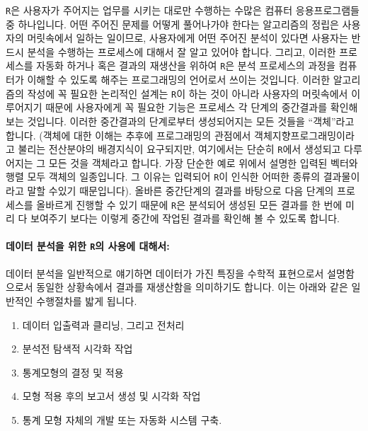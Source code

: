 \documentclass[tutorial.tex]{subfiles}
\begin{document}
\texttt{R}은 사용자가 주어지는 업무를 시키는 대로만 수행하는 수많은 컴퓨터 응용프로그램들 중 하나입니다.
어떤 주어진 문제를 어떻게 풀어나가야 한다는 알고리즘의 정립은 사용자의 머릿속에서 일하는 일이므로, 사용자에게 어떤 주어진 분석이 있다면 사용자는 반드시 분석을 수행하는 프로세스에 대해서 잘 알고 있어야 합니다.
그리고, 이러한 프로세스를 자동화 하거나 혹은 결과의 재생산을 위하여 \texttt{R}은 분석 프로세스의 과정을 컴퓨터가 이해할 수 있도록 해주는 프로그래밍의 언어로서 쓰이는 것입니다.
이러한 알고리즘의 작성에 꼭 필요한 논리적인 설계는 \texttt{R}이 하는 것이 아니라 사용자의 머릿속에서 이루어지기 때문에 사용자에게 꼭 필요한 기능은 프로세스 각 단계의 중간결과를 확인해 보는 것입니다. 
이러한 중간결과의 단계로부터 생성되어지는 모든 것들을 ``객체''라고 합니다.
(객체에 대한 이해는 추후에 프로그래밍의 관점에서 객체지향프로그래밍이라고 불리는 전산분야의 배경지식이 요구되지만, 여기에서는 단순히 \texttt{R}에서 생성되고 다루어지는 그 모든 것을 객체라고 합니다.  
가장 단순한 예로 위에서 설명한 입력된 벡터와 행렬 모두 객체의 일종입니다.
그 이유는 입력되어 \texttt{R}이 인식한 어떠한 종류의 결과물이라고 말할 수있기 때문입니다).
올바른 중간단계의 결과를 바탕으로 다음 단계의 프로세스를 올바르게 진행할 수 있기 때문에 \texttt{R}은 분석되어 생성된 모든 결과를 한 번에 미리 다 보여주기 보다는 이렇게 중간에 작업된 결과를 확인해 볼 수 있도록 합니다. 
%

\paragraph{데이터 분석을 위한 \texttt{R}의 사용에 대해서:} 

데이터 분석을 일반적으로 얘기하면 데이터가 가진 특징을 수학적 표현으로서 설명함으로서 동일한 상황속에서 결과를 재생산함을 의미하기도 합니다. 
이는 아래와 같은 일반적인 수행절차를 밟게 됩니다. 
%
	\begin{enumerate}
	\item 데이터 입출력과 클리닝, 그리고 전처리
	\item 분석전 탐색적 시각화 작업 
	\item 통계모형의 결정 및 적용 
	\item 모형 적용 후의 보고서 생성 및 시각화 작업
	\item 통계 모형 자체의 개발 또는 자동화 시스템 구축.
	\end{enumerate}
	
\end{document}
